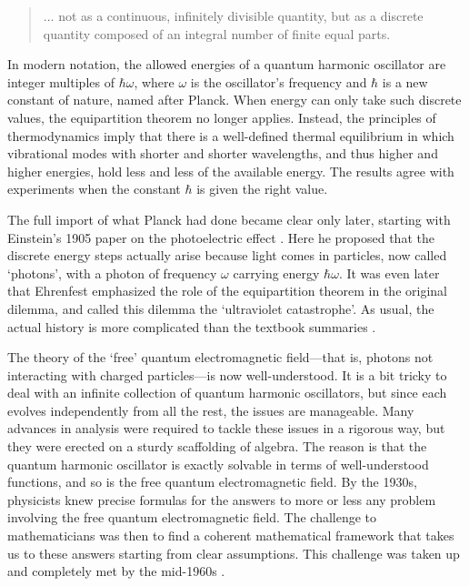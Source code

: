 \documentclass{article}
\begin{document}
\begin{quote}
... not as a continuous, infinitely divisible quantity, but as a discrete quantity composed of an integral number of finite equal parts.
\end{quote}

In modern notation, the allowed energies of a quantum harmonic oscillator are integer multiples of $\hbar \omega$, where $\omega$ is the oscillator's frequency and $\hbar$ is a new constant of nature, named after Planck.   When energy can only take such discrete values, the equipartition theorem no longer applies.  Instead, the principles of thermodynamics imply that there is a well-defined thermal equilibrium in which vibrational modes with shorter and shorter wavelengths, and thus higher and higher energies, hold less and less of the available energy.   The results agree with experiments when the constant $\hbar$ is given the right value.

The full import of what Planck had done became clear only later, starting with Einstein's 1905 paper on the photoelectric effect \cite{Einstein}.  Here he proposed that the discrete energy steps actually arise because light comes in particles, now called `photons', with a photon of frequency $\omega$ carrying energy $\hbar \omega$.   It was even later that Ehrenfest emphasized the role of the equipartition theorem in the original dilemma, and called this dilemma the `ultraviolet catastrophe'.  As usual, the actual history is more complicated than the textbook summaries \cite{Kragh}.

The theory of the `free' quantum electromagnetic field---that is, photons not interacting with charged particles---is now well-understood.   It is a bit tricky to deal with an infinite collection of quantum harmonic oscillators, but since each evolves independently from all the rest, the issues are manageable.  Many advances in analysis were required to tackle these issues in a rigorous way, but they were erected on a sturdy scaffolding of algebra.  The reason is that the quantum harmonic oscillator is exactly solvable in terms of well-understood functions, and so is the free quantum electromagnetic field.   By the 1930s,  physicists knew precise formulas for the answers to more or less any problem involving the free quantum electromagnetic field.  The challenge to mathematicians was then to find a coherent mathematical framework that takes us to these answers starting from clear assumptions.  This challenge was taken up and completely met by the mid-1960s \cite{BSZ}.
\end{document}
